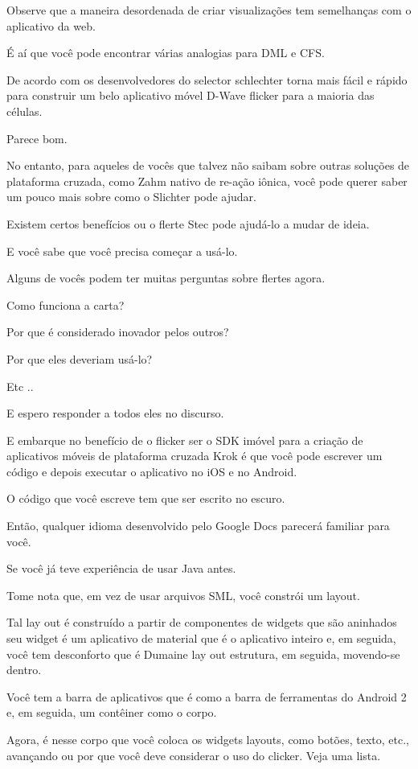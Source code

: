Observe que a maneira desordenada de criar visualizações tem semelhanças com o aplicativo da web.

É aí que você pode encontrar várias analogias para DML e CFS.

De acordo com os desenvolvedores do selector schlechter torna mais fácil e rápido para construir um belo aplicativo móvel D-Wave flicker para a maioria das células.

Parece bom.

No entanto, para aqueles de vocês que talvez não saibam sobre outras soluções de plataforma cruzada, como Zahm nativo de re-ação iônica, você pode querer saber um pouco mais sobre como o Slichter pode ajudar.

Existem certos benefícios ou o flerte Stec pode ajudá-lo a mudar de ideia.

E você sabe que você precisa começar a usá-lo.

Alguns de vocês podem ter muitas perguntas sobre flertes agora.

Como funciona a carta?

Por que é considerado inovador pelos outros?

Por que eles deveriam usá-lo?

Etc ..

E espero responder a todos eles no discurso.

E embarque no benefício de o flicker ser o SDK imóvel para a criação de aplicativos móveis de plataforma cruzada Krok é que você pode escrever um código e depois executar o aplicativo no iOS e no Android.

O código que você escreve tem que ser escrito no escuro.

Então, qualquer idioma desenvolvido pelo Google Docs parecerá familiar para você.

Se você já teve experiência de usar Java antes.

Tome nota que, em vez de usar arquivos SML, você constrói um layout.

Tal lay out é construído a partir de componentes de widgets que são aninhados seu widget é um aplicativo de material que é o aplicativo inteiro e, em seguida, você tem desconforto que é Dumaine lay out estrutura, em seguida, movendo-se dentro.

Você tem a barra de aplicativos que é como a barra de ferramentas do Android 2 e, em seguida, um contêiner como o corpo.

Agora, é nesse corpo que você coloca os widgets layouts, como botões, texto, etc., avançando ou por que você deve considerar o uso do clicker. Veja uma lista.

